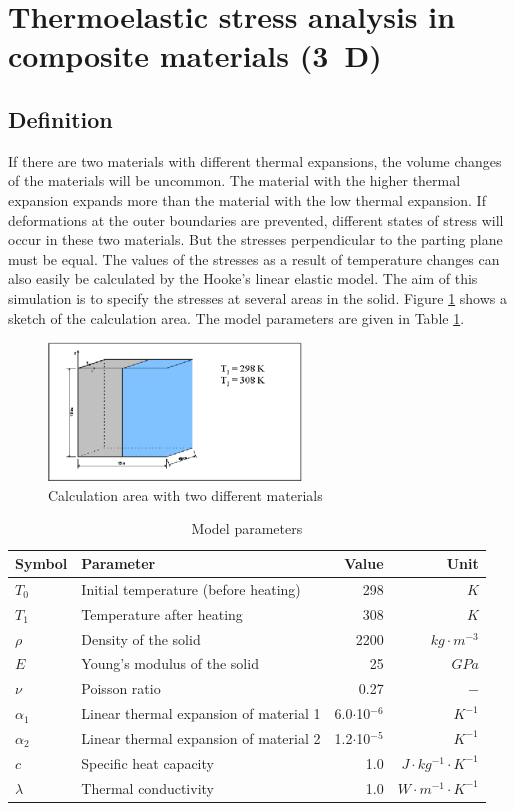 \section{Thermoelastic stress analysis in composite materials (3~D)}
\subsection{Definition}
If there are two materials with different thermal expansions, the volume changes of the materials will be uncommon. The material with the higher thermal expansion expands more than the material with the low thermal expansion. If deformations at the outer boundaries are prevented, different states of stress will occur in these two materials. But the stresses perpendicular to the parting plane must be equal. The values of the stresses as a result of temperature changes can also easily be calculated by the Hooke's linear elastic model. The aim of this simulation is to specify the stresses at several areas in the solid. Figure \ref{fig64} shows a sketch of the calculation area. The model parameters are given in Table \ref{tab62}.

\begin{figure}[htbp]
\centering
\includegraphics[width=0.6\textwidth]{PART_III/TM/figures/fig64}
\caption{Calculation area with two different materials}
\label{fig64}
\end{figure}

\begin{table}[htbp]
\centering
\caption{Model parameters}
\label{tab62}
\begin{tabular}{llrr}
\toprule
Symbol & Parameter & Value & Unit \\
\midrule
$T_0$  & Initial temperature (before heating) & 298 & $K$ \\
$T_1$  & Temperature after heating & 308 & $K$ \\
$\rho$  & Density of the solid &  2200 & $kg\cdot m^{-3}$  \\			
$E$ & Young's modulus of the solid & 25 & $GPa$ \\
$\nu$ & Poisson ratio & 0.27 & $-$ \\
$\alpha_1$ & Linear thermal expansion of material 1 & 6.0$\cdot$10$^{-6}$ & $K^{-1}$ \\
$\alpha_2$ & Linear thermal expansion of material 2 & 1.2$\cdot$10$^{-5}$ & $K^{-1}$ \\
$c$      & Specific heat capacity & 1.0 & $J\cdot kg^{-1}\cdot K^{-1}$ \\
$\lambda$ & Thermal conductivity & 1.0 & $W\cdot m^{-1}\cdot K^{-1}$ \\
\bottomrule
\end{tabular}
\end{table}

